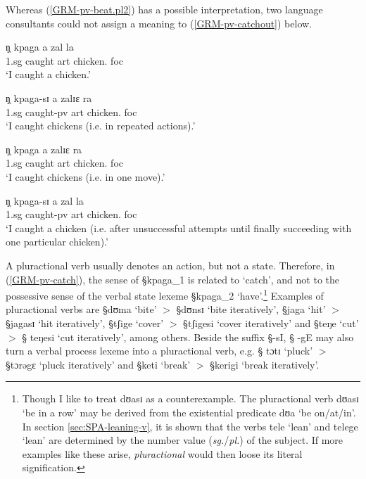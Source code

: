 Whereas  (\ref{GRM-pv-beat.pl2})
has a possible interpretation, two language consultants
could not assign a meaning to (\ref{GRM-pv-catchout}) below. 




\begin{exe}
\ex\label{GRM-pv-catch}
  \begin{xlist}
    \ex\label{GRM-pv-catchsg}
\gll    ŋ̩  kpaga  a  zal  la  \\
         {\sc 1.sg}   {caught} {\sc art} {chicken.\sg} {\sc foc}\\
\glt `I caught a chicken.'


 \ex\label{GRM-pv-catchpl1}
\gll    ŋ̩    kpaga-sɪ  a  zalɪɛ ra  \\
       {\sc 1.sg} {caught-{\sc pv}} {\sc art} {chicken.\pl} {\sc foc}\\
\glt `I caught chickens (i.e. in repeated actions).'


 \ex\label{GRM-pv-catchpl2}
\gll   ŋ̩     kpaga  a  zalɪɛ ra   \\
       {\sc 1.sg}  {caught} {\sc art} {chicken.\pl} {\sc foc}\\
\glt `I caught chickens (i.e. in one move).'


 \ex\label{GRM-pv-catchout}
\gll *     ŋ̩  kpaga-sɪ  a  zal  la  \\
     {}   {\sc 1.sg}  {caught-{\sc pv}} {\sc art} {chicken.\sg} {\sc foc}\\
\glt `I caught a chicken (i.e. after unsuccessful attempts until finally
succeeding with
one particular chicken).'

 \end{xlist}
\end{exe}

A pluractional verb usually denotes an action, but not a state. Therefore, in
(\ref{GRM-pv-catch}), the sense of {\S kpaga}_{1} is related to `catch', and not
to the  possessive sense of the verbal state lexeme   {\S kpaga}_{2}
`have'.\footnote{Though I like to treat {\F dʊasɪ} as a counterexample.  The
pluractional verb {\F dʊasɪ} `be in a row'  may be  derived from the existential
predicate {\F dʊa} `be on/at/in'.  In section \ref{sec:SPA-leaning-v}, it is
shown that the verbs {\F tele} `lean'   and {\F telege} `lean' are determined by
the number value ({\it sg.}/{\it  pl.})  of the subject.  If more examples like
these  arise, {\it pluractional} would then loose its literal signification.}
Examples of pluractional verbs are {\S dʊma} `bite' $>$ {\S dʊnsɪ}  `bite
iteratively', {\S jaga} `hit' $>$ {\S jagasɪ} `hit iteratively', {\S tʃige}
`cover' $>$ {\S tʃigesi}  `cover iteratively' and {\S teŋe} `cut' $>$ {\S
teŋesi}  `cut iteratively',  among others.  Beside the suffix {\S -sI}, {\S
-gE} may also turn a verbal process lexeme into a pluractional verb, e.g.   {\S
tɔtɪ} `pluck' $>$ {\S  tɔrəgɛ} `pluck iteratively' and  {\S keti} `break'  $>$
{\S kerigi} `break iteratively'.



